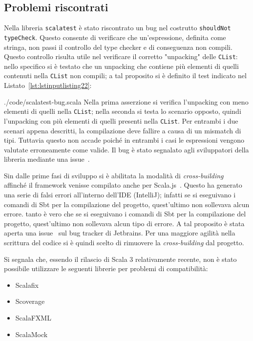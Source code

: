 \subsection{Problemi riscontrati}\label{subsec:problemi-riscontrati}
Nella libreria \texttt{scalatest} è stato riscontrato un bug nel costrutto \texttt{shouldNot typeCheck}.
Questo consente di verificare che un'espressione, definita come stringa, non passi il controllo del type
checker e di conseguenza non compili.
Questo controllo risulta utile nel verificare il corretto "unpacking" delle \texttt{CList}: nello specifico si è testato
che un unpacking che contiene più elementi di quelli contenuti nella \texttt{CList} non compili;
a tal proposito si è definito il test indicato nel Listato~\ref{lst:lstinputlisting22}:

{./code/scalatest-bug.scala}
Nella prima asserzione si verifica l'unpacking con meno elementi di quelli nella \texttt{CList};
nella seconda si testa lo scenario opposto, quindi l'unpacking con più elementi di quelli presenti nella \texttt{CList}.
Per entrambi i due scenari appena descritti, la compilazione deve fallire a causa di un mismatch di tipi.
Tuttavia questo non accade poiché in entrambi i casi le espressioni vengono valutate erroneamente come valide.
Il bug è stato segnalato agli sviluppatori della libreria mediante una issue~\cite{scalatest-bug}.

Sin dalle prime fasi di sviluppo si è abilitata la modalità di \textit{cross-building}~\cite{cross-building} affinché il
framework venisse compilato anche per Scala.js~\cite{scalajs}.
Questo ha generato una serie di falsi errori all'interno dell'IDE (IntelliJ);
infatti se si eseguivano i comandi di Sbt per la compilazione del progetto, quest'ultimo non sollevava alcun errore.
tanto è vero che se si eseguivano i comandi di Sbt per la compilazione del progetto, quest'ultimo non sollevava alcun
tipo di errore.
A tal proposito è stata aperta una issue~\cite{intellij-issue} sul bug tracker di Jetbrains.
Per una maggiore agilità nella scrittura del codice si è quindi scelto di rimuovere la \textit{cross-building} dal
progetto.

Si segnala che, essendo il rilascio di Scala 3 relativamente recente, non è stato possibile utilizzare
le seguenti librerie per problemi di compatibilità:
\begin{itemize}
    \item Scalafix
    \item Scoverage
    \item ScalaFXML
    \item ScalaMock
\end{itemize}

